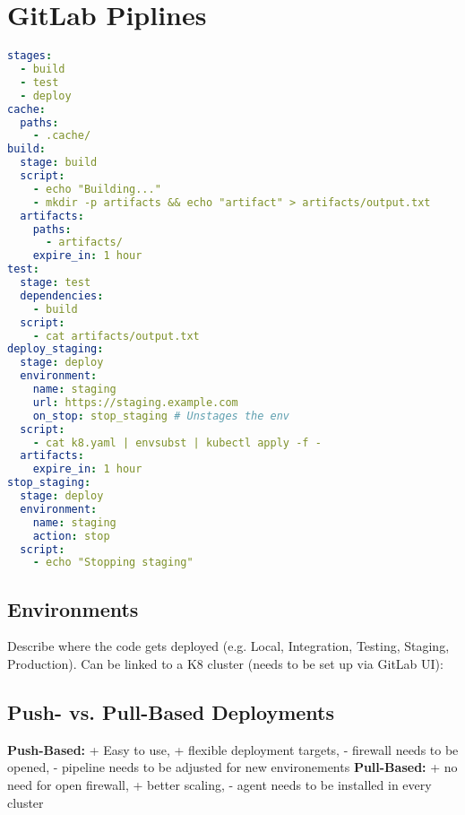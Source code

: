 \section{GitLab Piplines}
\begin{lstlisting}[language=yaml]
stages:
  - build
  - test
  - deploy
cache:
  paths:
    - .cache/
build:
  stage: build
  script:
    - echo "Building..."
    - mkdir -p artifacts && echo "artifact" > artifacts/output.txt
  artifacts:
    paths:
      - artifacts/
    expire_in: 1 hour
test:
  stage: test
  dependencies:
    - build
  script:
    - cat artifacts/output.txt
deploy_staging:
  stage: deploy
  environment:
    name: staging
    url: https://staging.example.com
    on_stop: stop_staging # Unstages the env
  script:
    - cat k8.yaml | envsubst | kubectl apply -f -
  artifacts:
    expire_in: 1 hour
stop_staging:
  stage: deploy
  environment:
    name: staging
    action: stop
  script:
    - echo "Stopping staging"
\end{lstlisting}
\subsection{Environments}
Describe where the code gets deployed (e.g. Local, Integration, Testing, Staging, Production). Can be linked to a K8 cluster (needs to be set up via GitLab UI):
\subsection{Push- vs. Pull-Based Deployments}
\textbf{Push-Based:} + Easy to use, + flexible deployment targets, - firewall needs to be opened, - pipeline needs to be adjusted for new environements \textbf{Pull-Based:} + no need for open firewall, + better scaling, - agent needs to be installed in every cluster
